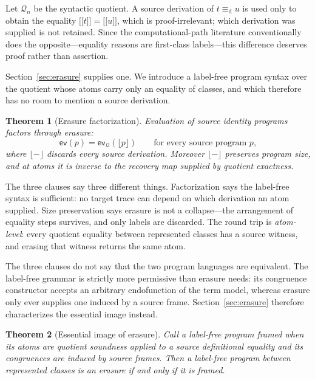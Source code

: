 \documentclass[10pt,reqno]{amsart}
\newtheorem{theorem}{Theorem}[section]
\newcommand{\ev}{\mathsf{ev}}
\newcommand{\den}[1]{\mathopen{\lbrack\!\lbrack}#1\mathclose{\rbrack\!\rbrack}}
\newcommand{\defeq}{\mathrel{\equiv_{\mathrm d}}}
\newcommand{\Q}{\mathcal{Q}}
\begin{document}
Let \(\Q_n\) be the syntactic quotient.  A source derivation of \(t\defeq u\)
is used only to obtain the equality \(\den t=\den u\), which is
proof-irrelevant; which derivation was supplied is not retained.  Since the
computational-path literature conventionally does the opposite---equality
reasons are first-class labels---this difference deserves proof rather than
assertion.

Section~\ref{sec:erasure} supplies one.  We introduce a label-free program
syntax over the quotient whose atoms carry only an equality of classes, and
which therefore has no room to mention a source derivation.

\begin{theorem}[Erasure factorization]
\label{thm:intro-erasure}
Evaluation of source identity programs factors through erasure:
\[
 \ev(p)=\ev_{\Q}(\lfloor p\rfloor)
 \qquad\text{for every source program }p,
\tag{1.2}\label{eq:intro-erasure}
\]
where \(\lfloor-\rfloor\) discards every source derivation.  Moreover
\(\lfloor-\rfloor\) preserves program size, and at atoms it is inverse to the
recovery map supplied by quotient exactness.
\end{theorem}

The three clauses say three different things.  Factorization says the
label-free syntax is sufficient: no target trace can depend on which derivation
an atom supplied.  Size preservation says erasure is not a collapse---the
arrangement of equality steps survives, and only labels are discarded.  The
round trip is \emph{atom-level}: every quotient equality between represented
classes has a source witness, and erasing that witness returns the same atom.

The three clauses do not say that the two program languages are equivalent.  The
label-free grammar is strictly more permissive than erasure needs: its
congruence constructor accepts an arbitrary endofunction of the term model,
whereas erasure only ever supplies one induced by a source frame.
Section~\ref{sec:erasure} therefore characterizes the essential image instead.

\begin{theorem}[Essential image of erasure]
\label{thm:intro-image}
Call a label-free program \emph{framed} when its atoms are quotient soundness
applied to a source definitional equality and its congruences are induced by
source frames.  Then a label-free program between represented classes is an
erasure if and only if it is framed.
\end{theorem}
\end{document}
